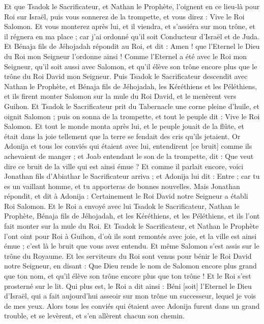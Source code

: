 \begin{multicols}{2}
Et que Tsadok le Sacrificateur, et Nathan le Prophète, l'oignent en ce lieu-là pour Roi sur Israël, puis vous sonnerez de la trompette, et vous direz : Vive le Roi Salomon.
Et vous monterez après lui, et il viendra, et s'assiéra sur mon trône, et il régnera en ma place ; car j'ai ordonné qu'il soit Conducteur d'Israël et de Juda.
Et Bénaja fils de Jéhojadah répondit au Roi, et dit : Amen ! que l'Eternel le Dieu du Roi mon Seigneur l'ordonne ainsi !
Comme l'Eternel a été avec le Roi mon Seigneur, qu'il soit aussi avec Salomon, et qu'il élève son trône encore plus que le trône du Roi David mon Seigneur.
Puis Tsadok le Sacrificateur descendit avec Nathan le Prophète, et Bénaja fils de Jéhojadah, les Kéréthiens et les Péléthiens, et ils firent monter Salomon sur la mule du Roi David, et le menèrent vers Guihon.
Et Tsadok le Sacrificateur prit du Tabernacle une corne pleine d'huile, et oignit Salomon ; puis on sonna de la trompette, et tout le peuple dit : Vive le Roi Salomon.
Et tout le monde monta après lui, et le peuple jouait de la flûte, et était dans la joie tellement que la terre se fendait des cris qu'ils jetaient.
Or Adonija et tous les conviés qui étaient avec lui, entendirent [ce bruit] comme ils achevaient de manger ; et Joab entendant le son de la trompette, dit : Que veut dire ce bruit de la ville qui est ainsi émue ?
Et comme il parlait encore, voici Jonathan fils d'Abiathar le Sacrificateur arriva ; et Adonija lui dit : Entre ; car tu es un vaillant homme, et tu apporteras de bonnes nouvelles.
Mais Jonathan répondit, et dit à Adonija : Certainement le Roi David notre Seigneur a établi Roi Salomon.
Et le Roi a envoyé avec lui Tsadok le Sacrificateur, Nathan le Prophète, Bénaja fils de Jéhojadah, et les Kéréthiens, et les Péléthiens, et ils l'ont fait monter sur la mule du Roi.
Et Tsadok le Sacrificateur, et Nathan le Prophète l'ont oint pour Roi à Guihon, d'où ils sont remontés avec joie, et la ville est ainsi émue ; c'est là le bruit que vous avez entendu.
Et même Salomon s'est assis sur le trône du Royaume.
Et les serviteurs du Roi sont venus pour bénir le Roi David notre Seigneur, en disant : Que Dieu rende le nom de Salomon encore plus grand que ton nom, et qu'il élève son trône encore plus que ton trône ! Et le Roi s'est prosterné sur le lit.
Qui plus est, le Roi a dit ainsi : Béni [soit] l'Eternel le Dieu d'Israël, qui a fait aujourd'hui asseoir sur mon trône un successeur, lequel je vois de mes yeux.
Alors tous les conviés qui étaient avec Adonija furent dans un grand trouble, et se levèrent, et s'en allèrent chacun son chemin.

\end{multicols}
